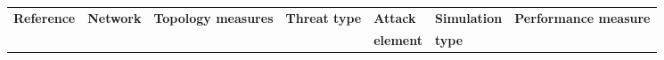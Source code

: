 

\begin{landscape}
\begin{table}[h!]
\scriptsize
\centering
\resizebox{1.2\textheight}{!} {

\begin{tabular}{lllllll}
\toprule

\multirow{2}{*}{\textbf{Reference}} & \multirow{2}{*}{\textbf{Network}} & \multirow{2}{*}{\textbf{Topology measures}} & \multirow{2}{*}{\textbf{Threat type}} & \textbf{Attack} & \textbf{Simulation} & \multirow{2}{*}{\textbf{Performance measure}} \\ 
 &  &  &  & \textbf{element} & \textbf{type} & \\ 

\midrule


\end{tabular}}
\end{table}
\end{landscape}
